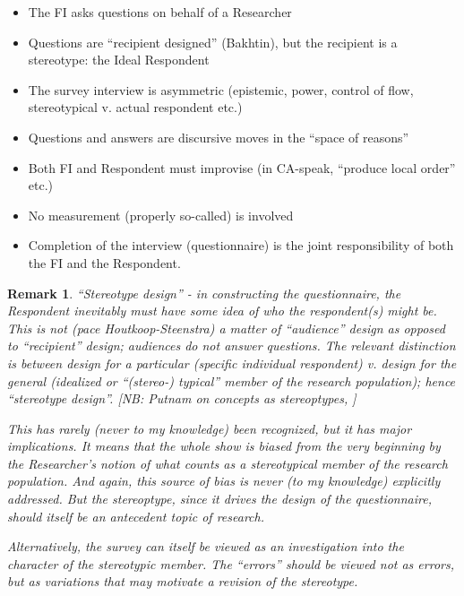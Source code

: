 \documentclass[11pt,twoside]{article}
\newtheorem{remark}{Remark}
\begin{document}
\begin{itemize}
\item The FI asks questions on behalf of a Researcher
\item Questions are ``recipient designed'' (Bakhtin), but the
  recipient is a stereotype: the Ideal Respondent
\item The survey interview is asymmetric (epistemic, power, control of
  flow, stereotypical v. actual respondent etc.)
\item Questions and answers are discursive moves in the ``space of reasons''
\item Both FI and Respondent must improvise (in CA-speak, ``produce local order'' etc.)
\item No measurement (properly so-called) is involved
\item Completion of the interview (questionnaire) is the joint
  responsibility of both the FI and the Respondent.
\end{itemize}

\begin{remark}
  ``Stereotype design'' - in constructing the questionnaire, the
  Respondent inevitably must have some idea of who the respondent(s)
  might be.  This is not (\textit{pace} Houtkoop-Steenstra) a matter
  of ``audience'' design as opposed to ``recipient'' design; audiences
  do not answer questions.  The relevant distinction is between design
  for a particular (specific individual respondent) v. design for the
  general (idealized or ``(stereo-) typical'' member of the research
  population); hence ``stereotype design''.  [NB: Putnam on concepts
    as stereoptypes, \cite{putnam_meaning_1975}]

  This has rarely (never to my knowledge) been recognized, but it has
  major implications.  It means that the whole show is biased from the
  very beginning by the Researcher's notion of what counts as a
  stereotypical member of the research population.  And again, this
  source of bias is never (to my knowledge) explicitly addressed.  But
  the stereoptype, since it drives the design of the questionnaire,
  should itself be an antecedent topic of research.

Alternatively, the survey can itself be viewed as an investigation
into the character of the stereotypic member.  The ``errors'' should
be viewed not as errors, but as variations that may motivate a
revision of the stereotype.

\end{remark}
\end{document}
